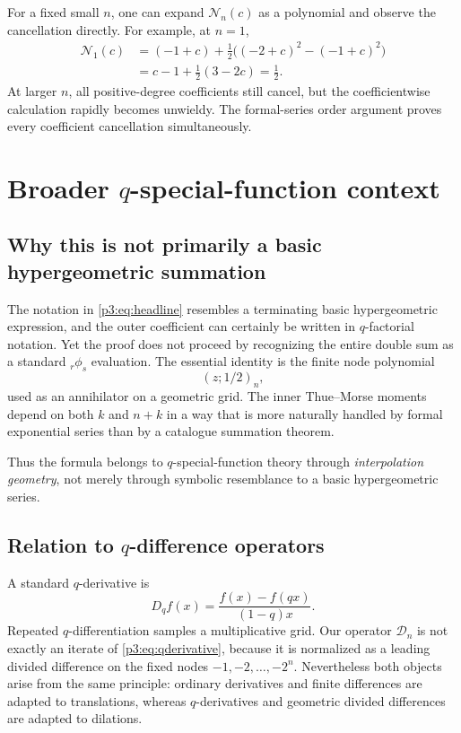 \documentclass[11pt,oneside]{article}
\theoremstyle{definition}
\theoremstyle{remark}
\newcommand{\qpoch}[3]{\left(#1;#2\right)_{#3}}
\begin{document}
For a fixed small $n$, one can expand $\mathcal N_n(c)$ as a polynomial and
observe the cancellation directly.  For example, at $n=1$,
\begin{align*}
 \mathcal N_1(c)
 &=(-1+c)
 +\frac12\bigl((-2+c)^2-(-1+c)^2\bigr)\\
 &=c-1+\frac12(3-2c)=\frac12.
\end{align*}
At larger $n$, all positive-degree coefficients still cancel, but the
coefficientwise calculation rapidly becomes unwieldy.  The formal-series
order argument proves every coefficient cancellation simultaneously.

\section{Broader \texorpdfstring{$q$-special-function}{q-special-function} context}

\subsection{Why this is not primarily a basic hypergeometric summation}

The notation in \eqref{p3:eq:headline} resembles a terminating basic
hypergeometric expression, and the outer coefficient can certainly be
written in $q$-factorial notation.  Yet the proof does not proceed by
recognizing the entire double sum as a standard ${}_r\phi_s$ evaluation.
The essential identity is the finite node polynomial
\[
 \qpoch{z}{1/2}{n},
\]
used as an annihilator on a geometric grid.  The inner Thue--Morse moments
depend on both $k$ and $n+k$ in a way that is more naturally handled by
formal exponential series than by a catalogue summation theorem.

Thus the formula belongs to $q$-special-function theory through
\emph{interpolation geometry}, not merely through symbolic resemblance to a
basic hypergeometric series.

\subsection{Relation to \texorpdfstring{$q$-difference operators}{q-difference operators}}

A standard $q$-derivative is
\begin{equation}\label{p3:eq:qderivative}
 D_qf(x)=\frac{f(x)-f(qx)}{(1-q)x}.
\end{equation}
Repeated $q$-differentiation samples a multiplicative grid.  Our operator
$\mathcal D_n$ is not exactly an iterate of \eqref{p3:eq:qderivative}, because
it is normalized as a leading divided difference on the fixed nodes
$-1,-2,\ldots,-2^n$.  Nevertheless both objects arise from the same
principle: ordinary derivatives and finite differences are adapted to
translations, whereas $q$-derivatives and geometric divided differences are
adapted to dilations.
\end{document}
